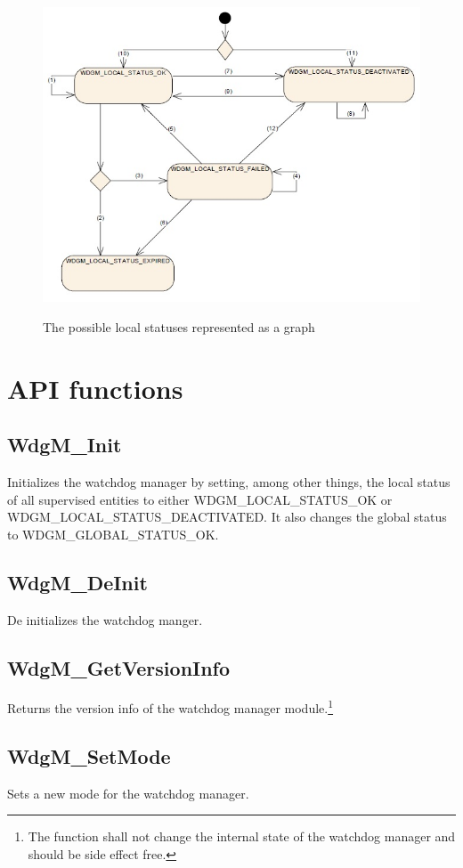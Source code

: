 \begin{figure}[!ht]
\includegraphics{pictures/localstatuses}
\label{APP:FIG:LOCALSTATUSES}
\caption{The possible local statuses represented as a graph}
\end{figure}

\section{API functions}
\label{APP:API_CALLS}
\subsection{WdgM\_Init}
Initializes the watchdog manager by setting, among other things, the local
status of all supervised entities to either WDGM\_LOCAL\_STATUS\_OK or
WDGM\_LOCAL\_STATUS\_DEACTIVATED. It also changes the global status to
WDGM\_GLOBAL\_STATUS\_OK.
\subsection{WdgM\_DeInit}
De initializes the watchdog manger.
\subsection{WdgM\_GetVersionInfo}
Returns the version info of the watchdog manager module.\footnote{The function shall not change the
internal state of the watchdog manager and should be side effect free.}
\subsection{WdgM\_SetMode}
Sets a new mode for the watchdog manager.
